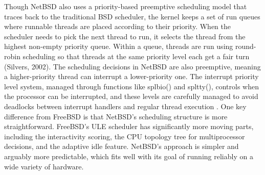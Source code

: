 Though NetBSD also uses a priority-based preemptive scheduling model that traces back to the traditional BSD scheduler, the kernel keeps a set of run queues where runnable threads are placed according to their priority. When the scheduler needs to pick the next thread to run, it selects the thread from the highest non-empty priority queue. Within a queue, threads are run using round-robin scheduling so that threads at the same priority level each get a fair turn (Silvers, 2002).
The scheduling decisions in NetBSD are also preemptive, meaning a higher-priority thread can interrupt a lower-priority one. The interrupt priority level system, managed through functions like splbio() and spltty(), controls when the processor can be interrupted, and these levels are carefully managed to avoid deadlocks between interrupt handlers and regular thread execution \parencite{netBSDnd}.
One key difference from FreeBSD is that NetBSD's scheduling structure is more straightforward. FreeBSD's ULE scheduler has significantly more moving parts, including the interactivity scoring, the CPU topology tree for multiprocessor decisions, and the adaptive idle feature. NetBSD's approach is simpler and arguably more predictable, which fits well with its goal of running reliably on a wide variety of hardware.

